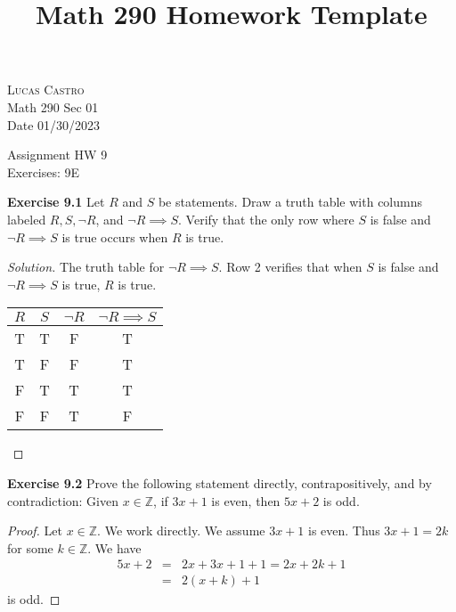 \documentclass[12pt,oneside]{article}
\newenvironment{exercise}[1]{\vspace{.1in}\noindent\textbf{Exercise #1 \hspace{.05em}}}{}
\newcommand{\Z}{\mathbb{Z}}
\begin{document}
\title{Math 290 Homework Template}

\begin{flushright}
\textsc{Lucas Castro}  \\
Math 290 Sec 01\\
Date 01/30/2023
\end{flushright}

\begin{center}
\textsf{Assignment HW 9} \\
\textsf{Exercises: 9E}
\end{center}


\begin{exercise}{9.1}
Let $R$ and $S$ be statements. Draw a truth table with columns labeled $R, S, \lnot R$, and $\lnot R \implies S$. Verify that the only row where $S$ is false and $\lnot R \implies S$ is true occurs when $R$ is true.
\end{exercise}

\begin{proof}[Solution] 
The truth table for $\lnot R \implies S$. Row 2 verifies that when $S$ is false and $\lnot R \implies S$ is true, $R$ is true.

\begin{center}
\begin{tabular}{ c|c|c|c }
$R$ & $S$ & $\lnot R$ & $\lnot R \implies S$ \\
\hline
T & T & F & T \\
T & F & F & T \\
F & T & T & T \\
F & F & T & F \\
\end{tabular}
\end{center}
\end{proof}



\begin{exercise}{9.2}
Prove the following statement directly, contrapositively, and by contradiction: Given $x \in \Z$, if $3x + 1$ is even, then $5x + 2$ is odd.
\end{exercise}

\begin{proof}
Let $x \in \Z$. We work directly. We assume $3x + 1$ is even. Thus $3x + 1 = 2k$ for some $k \in \Z$. We have
\begin{eqnarray*}
5x + 2 &=& 2x + 3x + 1 + 1 = 2x + 2k + 1 \\
&=& 2(x + k) + 1
\end{eqnarray*}
is odd.
\end{proof}
\end{document}
